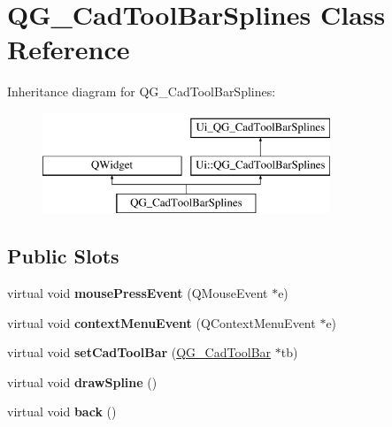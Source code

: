 \hypertarget{classQG__CadToolBarSplines}{\section{Q\-G\-\_\-\-Cad\-Tool\-Bar\-Splines Class Reference}
\label{classQG__CadToolBarSplines}
}
Inheritance diagram for Q\-G\-\_\-\-Cad\-Tool\-Bar\-Splines\-:\begin{figure}[H]
\begin{center}
\leavevmode
\includegraphics[height=3.000000cm]{classQG__CadToolBarSplines}
\end{center}
\end{figure}
\subsection*{Public Slots}
\begin{DoxyCompactItemize}
\item 
\hypertarget{classQG__CadToolBarSplines_a18fdce09277c76e917e8e547e2ac5028}{virtual void {\bfseries mouse\-Press\-Event} (Q\-Mouse\-Event $\ast$e)}\label{classQG__CadToolBarSplines_a18fdce09277c76e917e8e547e2ac5028}

\item 
\hypertarget{classQG__CadToolBarSplines_ac6421b199172e7fcfaf6af52c15ba7d5}{virtual void {\bfseries context\-Menu\-Event} (Q\-Context\-Menu\-Event $\ast$e)}\label{classQG__CadToolBarSplines_ac6421b199172e7fcfaf6af52c15ba7d5}

\item 
\hypertarget{classQG__CadToolBarSplines_a7df18c1f1a383e534723744440d87165}{virtual void {\bfseries set\-Cad\-Tool\-Bar} (\hyperlink{classQG__CadToolBar}{Q\-G\-\_\-\-Cad\-Tool\-Bar} $\ast$tb)}\label{classQG__CadToolBarSplines_a7df18c1f1a383e534723744440d87165}

\item 
\hypertarget{classQG__CadToolBarSplines_aa5763aaa8fd09f6dfcb3686e49689409}{virtual void {\bfseries draw\-Spline} ()}\label{classQG__CadToolBarSplines_aa5763aaa8fd09f6dfcb3686e49689409}

\item 
\hypertarget{classQG__CadToolBarSplines_ad63043435d47383c564ac5c4ba2b259a}{virtual void {\bfseries back} ()}\label{classQG__CadToolBarSplines_ad63043435d47383c564ac5c4ba2b259a}

\end{DoxyCompactItemize}
